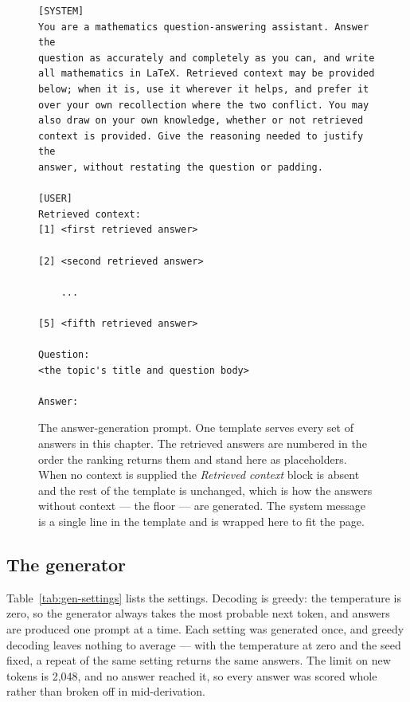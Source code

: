 \begin{figure}[t]
\begin{lstlisting}[frame=single,numbers=none,basicstyle=\ttfamily\footnotesize,
  breaklines=false,columns=fullflexible,xleftmargin=1em]
[SYSTEM]
You are a mathematics question-answering assistant. Answer the
question as accurately and completely as you can, and write
all mathematics in LaTeX. Retrieved context may be provided
below; when it is, use it wherever it helps, and prefer it
over your own recollection where the two conflict. You may
also draw on your own knowledge, whether or not retrieved
context is provided. Give the reasoning needed to justify the
answer, without restating the question or padding.

[USER]
Retrieved context:
[1] <first retrieved answer>

[2] <second retrieved answer>

    ...

[5] <fifth retrieved answer>

Question:
<the topic's title and question body>

Answer:
\end{lstlisting}
\caption[The answer-generation prompt]{The answer-generation prompt. One template serves every set
of answers in this chapter. The retrieved answers are numbered in the order the ranking returns them
and stand here as placeholders. When no context is supplied the \emph{Retrieved context} block is
absent and the rest of the template is unchanged, which is how the answers without context --- the
floor --- are generated. The system message is a single line in the template and is wrapped here to
fit the page.}
\label{fig:gen-prompt}
\end{figure}

\subsection*{The generator}

Table~\ref{tab:gen-settings} lists the settings. Decoding is greedy: the temperature is zero, so the
generator always takes the most probable next token, and answers are produced one prompt at a time.
Each setting was generated once, and greedy decoding leaves nothing to average --- with the
temperature at zero and the seed fixed, a repeat of the same setting returns the same answers. The
limit on new tokens is 2{,}048, and no answer reached it, so every answer was scored whole rather
than broken off in mid-derivation.

